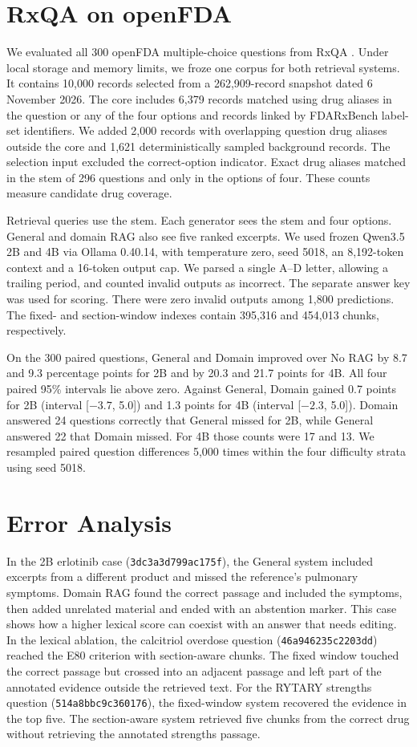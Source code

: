 \documentclass[11pt]{article}
\begin{document}
\section{RxQA on openFDA}
We evaluated all 300 openFDA multiple-choice questions from RxQA \citep{rxqa}. Under local storage and memory limits, we froze one corpus for both retrieval systems. It contains 10,000 records selected from a 262,909-record snapshot dated 6 November 2026. The core includes 6,379 records matched using drug aliases in the question or any of the four options and records linked by FDARxBench label-set identifiers. We added 2,000 records with overlapping question drug aliases outside the core and 1,621 deterministically sampled background records. The selection input excluded the correct-option indicator. Exact drug aliases matched in the stem of 296 questions and only in the options of four. These counts measure candidate drug coverage.

Retrieval queries use the stem. Each generator sees the stem and four options. General and domain RAG also see five ranked excerpts. We used frozen Qwen3.5 2B and 4B via Ollama 0.40.14, with temperature zero, seed 5018, an 8,192-token context and a 16-token output cap. We parsed a single A--D letter, allowing a trailing period, and counted invalid outputs as incorrect. The separate answer key was used for scoring. There were zero invalid outputs among 1,800 predictions. The fixed- and section-window indexes contain 395,316 and 454,013 chunks, respectively.


On the 300 paired questions, General and Domain improved over No RAG by 8.7 and 9.3 percentage points for 2B and by 20.3 and 21.7 points for 4B. All four paired 95\% intervals lie above zero. Against General, Domain gained 0.7 points for 2B (interval [$-3.7$, 5.0]) and 1.3 points for 4B (interval [$-2.3$, 5.0]). Domain answered 24 questions correctly that General missed for 2B, while General answered 22 that Domain missed. For 4B those counts were 17 and 13. We resampled paired question differences 5,000 times within the four difficulty strata using seed 5018.

\section{Error Analysis}
In the 2B erlotinib case (\texttt{3dc3a3d799ac175f}), the General system included excerpts from a different product and missed the reference's pulmonary symptoms. Domain RAG found the correct passage and included the symptoms, then added unrelated material and ended with an abstention marker. This case shows how a higher lexical score can coexist with an answer that needs editing.
In the lexical ablation, the calcitriol overdose question (\texttt{46a946235c2203dd}) reached the E80 criterion with section-aware chunks. The fixed window touched the correct passage but crossed into an adjacent passage and left part of the annotated evidence outside the retrieved text. For the RYTARY strengths question (\texttt{514a8bbc9c360176}), the fixed-window system recovered the evidence in the top five. The section-aware system retrieved five chunks from the correct drug without retrieving the annotated strengths passage.
\end{document}
